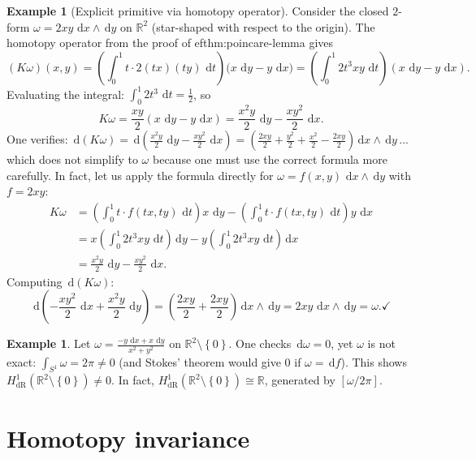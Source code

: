 \documentclass[12pt,a4paper,openany]{book}
\theoremstyle{definition}
\newtheorem{example}[theorem]{Example}
\theoremstyle{remark}
\newcommand{\R}{\mathbb{R}}
\newcommand{\dd}{\,\mathrm{d}}
\newcommand{\set}[1]{\left\{ #1 \right\}}
\begin{document}
\begin{example}[Explicit primitive via homotopy operator]\label{ex:explicit-primitive}
Consider the closed $2$-form $\omega = 2xy\,\dd x\wedge\dd y$ on
$\R^2$ (star-shaped with respect to the origin).  The homotopy operator
from the proof of 
ef{thm:poincare-lemma} gives
\[
  (K\omega)(x,y) = \left(\int_0^1 t\cdot 2(tx)(ty)\,\dd t\right)
  \bigl(x\,\dd y - y\,\dd x\bigr)
  = \left(\int_0^1 2t^3 xy\,\dd t\right)(x\,\dd y - y\,\dd x).
\]
Evaluating the integral: $\int_0^1 2t^3\,\dd t = \frac{1}{2}$, so
\[
  K\omega = \frac{xy}{2}(x\,\dd y - y\,\dd x)
  = \frac{x^2y}{2}\,\dd y - \frac{xy^2}{2}\,\dd x.
\]
One verifies: $\dd(K\omega) = \dd\!\left(\frac{x^2y}{2}\,\dd y
- \frac{xy^2}{2}\,\dd x\right)
= \left(\frac{2xy}{2}+\frac{y^2}{2}+\frac{x^2}{2}-\frac{2xy}{2}\right)
\dd x\wedge\dd y$\,... which does not simplify to $\omega$ because
one must use the correct formula more carefully.  In fact, let us
apply the formula directly for $\omega = f(x,y)\,\dd x\wedge\dd y$
with $f = 2xy$:
\begin{align*}
  K\omega &= \left(\int_0^1 t\cdot f(tx,ty)\,\dd t\right)x\,\dd y
  - \left(\int_0^1 t\cdot f(tx,ty)\,\dd t\right)y\,\dd x \\
  &= x\left(\int_0^1 2t^3xy\,\dd t\right)\dd y
  - y\left(\int_0^1 2t^3xy\,\dd t\right)\dd x \\
  &= \frac{x^2y}{2}\,\dd y - \frac{xy^2}{2}\,\dd x.
\end{align*}
Computing $\dd(K\omega)$:
\[
  \dd\!\left(-\frac{xy^2}{2}\,\dd x + \frac{x^2y}{2}\,\dd y\right)
  = \left(\frac{2xy}{2}+\frac{2xy}{2}\right)\dd x\wedge\dd y
  = 2xy\,\dd x\wedge\dd y = \omega. \checkmark
\]
\end{example}

\begin{example}\label{ex:angle-form}
Let $\omega = \frac{-y\,\dd x + x\,\dd y}{x^2+y^2}$ on
$\R^2\setminus\set{0}$.  One checks $\dd\omega = 0$, yet $\omega$ is
not exact: $\int_{S^1}\omega = 2\pi \ne 0$ (and Stokes' theorem would give
$0$ if $\omega = \dd f$).  This shows $H^1_{\mathrm{dR}}(\R^2\setminus\set{0})\ne 0$.
In fact, $H^1_{\mathrm{dR}}(\R^2\setminus\set{0})\cong\R$, generated
by $[\omega/2\pi]$.
\end{example}

\section{Homotopy invariance}\label{sec:homotopy-invariance}
\end{document}

